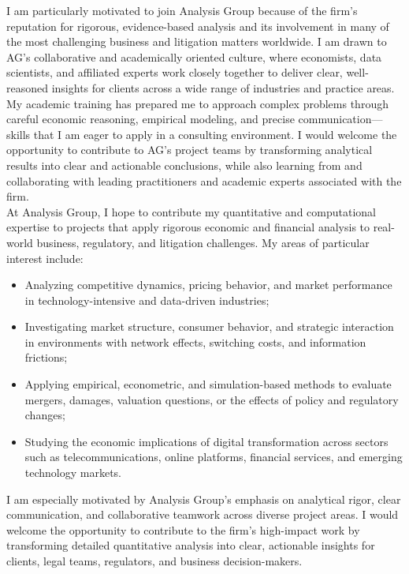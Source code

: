 \documentclass{nfr}
\begin{document}
I am particularly motivated to join Analysis Group because of the firm’s reputation for rigorous, evidence-based analysis and its involvement in many of the most challenging business and litigation matters worldwide. 
I am drawn to AG’s collaborative and academically oriented culture, where economists, data scientists, and affiliated experts work closely together to deliver clear, well-reasoned insights for clients across a wide range of industries and practice areas. 
My academic training has prepared me to approach complex problems through careful economic reasoning, empirical modeling, and precise communication—skills that I am eager to apply in a consulting environment. 
I would welcome the opportunity to contribute to AG’s project teams by transforming analytical results into clear and actionable conclusions, while also learning from and collaborating with leading practitioners and academic experts associated with the firm.\\

At Analysis Group, I hope to contribute my quantitative and computational expertise to projects that apply rigorous economic and financial analysis to real-world business, regulatory, and litigation challenges. 
My areas of particular interest include:
\begin{itemize}
    \item Analyzing competitive dynamics, pricing behavior, and market performance in technology-intensive and data-driven industries;
    \item Investigating market structure, consumer behavior, and strategic interaction in environments with network effects, switching costs, and information frictions;
    \item Applying empirical, econometric, and simulation-based methods to evaluate mergers, damages, valuation questions, or the effects of policy and regulatory changes;
    \item Studying the economic implications of digital transformation across sectors such as telecommunications, online platforms, financial services, and emerging technology markets.
\end{itemize}

I am especially motivated by Analysis Group’s emphasis on analytical rigor, clear communication, and collaborative teamwork across diverse project areas. 
I would welcome the opportunity to contribute to the firm’s high-impact work by transforming detailed quantitative analysis into clear, actionable insights for clients, legal teams, regulators, and business decision-makers.\\[0.2cm]
\end{document}
